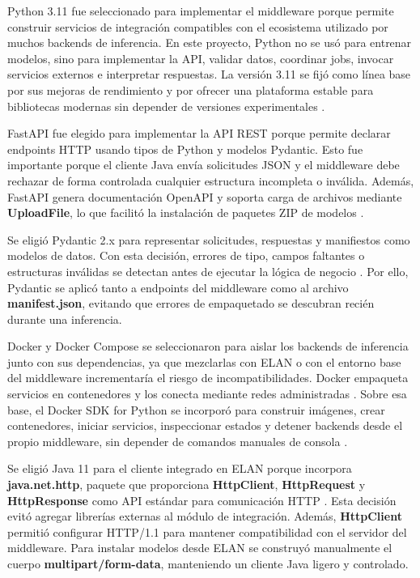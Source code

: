 Python 3.11 fue seleccionado para implementar el middleware porque permite construir servicios de integración compatibles con el ecosistema utilizado por muchos backends de inferencia. En este proyecto, Python no se usó para entrenar modelos, sino para implementar la API, validar datos, coordinar jobs, invocar servicios externos e interpretar respuestas. La versión 3.11 se fijó como línea base por sus mejoras de rendimiento y por ofrecer una plataforma estable para bibliotecas modernas sin depender de versiones experimentales \cite{python311docs}.

FastAPI fue elegido para implementar la API REST porque permite declarar endpoints HTTP usando tipos de Python y modelos Pydantic. Esto fue importante porque el cliente Java envía solicitudes JSON y el middleware debe rechazar de forma controlada cualquier estructura incompleta o inválida. Además, FastAPI genera documentación OpenAPI y soporta carga de archivos mediante \textbf{UploadFile}, lo que facilitó la instalación de paquetes ZIP de modelos \cite{fastapi2026features}.

Se eligió Pydantic 2.x para representar solicitudes, respuestas y manifiestos como modelos de datos. Con esta decisión, errores de tipo, campos faltantes o estructuras inválidas se detectan antes de ejecutar la lógica de negocio \cite{pydantic2026models}. Por ello, Pydantic se aplicó tanto a endpoints del middleware como al archivo \textbf{manifest.json}, evitando que errores de empaquetado se descubran recién durante una inferencia.

Docker y Docker Compose se seleccionaron para aislar los backends de inferencia junto con sus dependencias, ya que mezclarlas con ELAN o con el entorno base del middleware incrementaría el riesgo de incompatibilidades. Docker empaqueta servicios en contenedores y los conecta mediante redes administradas \cite{docker2026overview}. Sobre esa base, el Docker SDK for Python se incorporó para construir imágenes, crear contenedores, iniciar servicios, inspeccionar estados y detener backends desde el propio middleware, sin depender de comandos manuales de consola \cite{docker_sdk_python}.

Se eligió Java 11 para el cliente integrado en ELAN porque incorpora \textbf{java.net.http}, paquete que proporciona \textbf{HttpClient}, \textbf{HttpRequest} y \textbf{HttpResponse} como API estándar para comunicación HTTP \cite{java11_httpclient}. Esta decisión evitó agregar librerías externas al módulo de integración. Además, \textbf{HttpClient} permitió configurar HTTP/1.1 para mantener compatibilidad con el servidor del middleware. Para instalar modelos desde ELAN se construyó manualmente el cuerpo \textbf{multipart/form-data}, manteniendo un cliente Java ligero y controlado.

